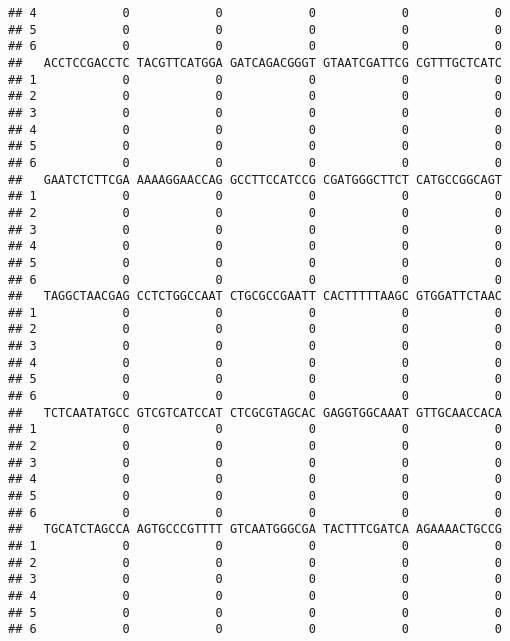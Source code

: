 \documentclass[]{article}
\begin{document}
\begin{verbatim}
## 4            0            0            0            0            0
## 5            0            0            0            0            0
## 6            0            0            0            0            0
##   ACCTCCGACCTC TACGTTCATGGA GATCAGACGGGT GTAATCGATTCG CGTTTGCTCATC
## 1            0            0            0            0            0
## 2            0            0            0            0            0
## 3            0            0            0            0            0
## 4            0            0            0            0            0
## 5            0            0            0            0            0
## 6            0            0            0            0            0
##   GAATCTCTTCGA AAAAGGAACCAG GCCTTCCATCCG CGATGGGCTTCT CATGCCGGCAGT
## 1            0            0            0            0            0
## 2            0            0            0            0            0
## 3            0            0            0            0            0
## 4            0            0            0            0            0
## 5            0            0            0            0            0
## 6            0            0            0            0            0
##   TAGGCTAACGAG CCTCTGGCCAAT CTGCGCCGAATT CACTTTTTAAGC GTGGATTCTAAC
## 1            0            0            0            0            0
## 2            0            0            0            0            0
## 3            0            0            0            0            0
## 4            0            0            0            0            0
## 5            0            0            0            0            0
## 6            0            0            0            0            0
##   TCTCAATATGCC GTCGTCATCCAT CTCGCGTAGCAC GAGGTGGCAAAT GTTGCAACCACA
## 1            0            0            0            0            0
## 2            0            0            0            0            0
## 3            0            0            0            0            0
## 4            0            0            0            0            0
## 5            0            0            0            0            0
## 6            0            0            0            0            0
##   TGCATCTAGCCA AGTGCCCGTTTT GTCAATGGGCGA TACTTTCGATCA AGAAAACTGCCG
## 1            0            0            0            0            0
## 2            0            0            0            0            0
## 3            0            0            0            0            0
## 4            0            0            0            0            0
## 5            0            0            0            0            0
## 6            0            0            0            0            0

\end{verbatim}
\end{document}
